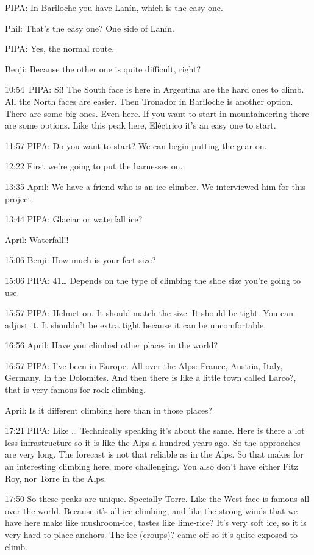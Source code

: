 PIPA: In Bariloche you have Lanín, which is the easy one.

Phil: That's the easy one? One side of Lanín.

PIPA: Yes, the normal route.

Benji: Because the other one is quite difficult, right?

10:54~PIPA: Sí! The South face is here in Argentina are the hard ones to
climb. All the North faces are easier. Then Tronador in Bariloche is
another option. There are some big ones. Even here. If you want to start
in mountaineering there are some options. Like this peak here, Eléctrico
it's an easy one to start.~

11:57 PIPA: Do you want to start? We can begin putting the gear on.

12:22 First we're going to put the harnesses on.

13:35 April: We have a friend who is an ice climber. We interviewed him
for this project.

13:44 PIPA: Glaciar or waterfall ice?

April: Waterfall!!

15:06 Benji: How much is your feet size?

15:06 PIPA: 41\ldots{} Depends on the type of climbing the shoe size
you're going to use.

15:57 PIPA: Helmet on. It should match the size. It should be tight. You
can adjust it. It shouldn't be extra tight because it can be
uncomfortable.

16:56 April: Have you climbed other places in the world?

16:57 PIPA: I've been in Europe. All over the Alps: France, Austria,
Italy, Germany. In the Dolomites. And then there is like a little town
called Larco?, that is very famous for rock climbing.~

April: Is it different climbing here than in those places?

17:21 PIPA: Like \ldots{} Technically speaking it's about the same. Here
is there a lot less infrastructure so it is like the Alps a hundred
years ago. So the approaches are very long. The forecast is not that
reliable as in the Alps. So that makes for an interesting climbing here,
more challenging. You also don't have either Fitz Roy, nor Torre in the
Alps.

17:50 So these peaks are unique. Specially Torre. Like the West face is
famous all over the world. Because it's all ice climbing, and like the
strong winds that we have here make like mushroom-ice, tastes like
lime-rice? It's very soft ice, so it is very hard to place anchors. The
ice (croups)? came off so it's quite exposed to climb.

